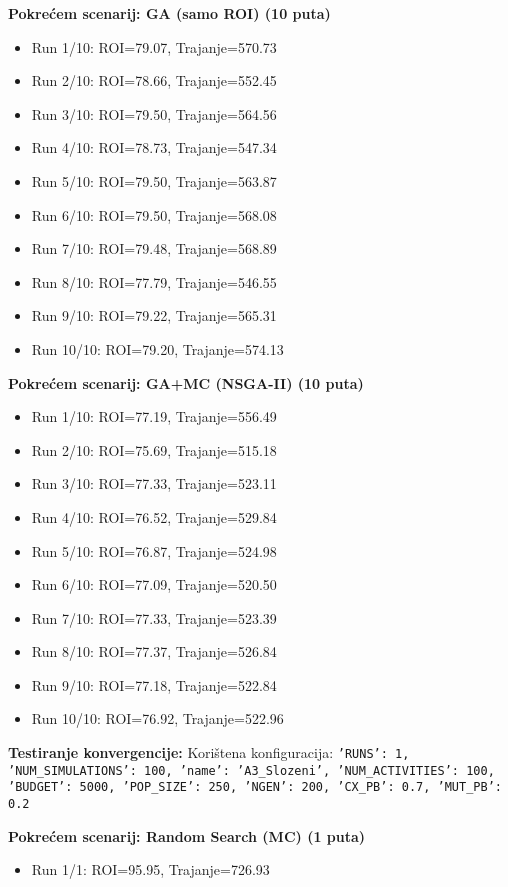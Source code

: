 \textbf{Pokrećem scenarij: GA (samo ROI) (10 puta)}
\begin{itemize}
    \item Run 1/10: ROI=79.07, Trajanje=570.73
    \item Run 2/10: ROI=78.66, Trajanje=552.45
    \item Run 3/10: ROI=79.50, Trajanje=564.56
    \item Run 4/10: ROI=78.73, Trajanje=547.34
    \item Run 5/10: ROI=79.50, Trajanje=563.87
    \item Run 6/10: ROI=79.50, Trajanje=568.08
    \item Run 7/10: ROI=79.48, Trajanje=568.89
    \item Run 8/10: ROI=77.79, Trajanje=546.55
    \item Run 9/10: ROI=79.22, Trajanje=565.31
    \item Run 10/10: ROI=79.20, Trajanje=574.13
\end{itemize}

\textbf{Pokrećem scenarij: GA+MC (NSGA-II) (10 puta)}
\begin{itemize}
    \item Run 1/10: ROI=77.19, Trajanje=556.49
    \item Run 2/10: ROI=75.69, Trajanje=515.18
    \item Run 3/10: ROI=77.33, Trajanje=523.11
    \item Run 4/10: ROI=76.52, Trajanje=529.84
    \item Run 5/10: ROI=76.87, Trajanje=524.98
    \item Run 6/10: ROI=77.09, Trajanje=520.50
    \item Run 7/10: ROI=77.33, Trajanje=523.39
    \item Run 8/10: ROI=77.37, Trajanje=526.84
    \item Run 9/10: ROI=77.18, Trajanje=522.84
    \item Run 10/10: ROI=76.92, Trajanje=522.96
\end{itemize}


\textbf{Testiranje konvergencije:}
Korištena konfiguracija: \texttt{'RUNS': 1, 'NUM\_SIMULATIONS': 100, 'name': 'A3\_Slozeni', 'NUM\_ACTIVITIES': 100, 'BUDGET': 5000, 'POP\_SIZE': 250, 'NGEN': 200, 'CX\_PB': 0.7, 'MUT\_PB': 0.2}

\textbf{Pokrećem scenarij: Random Search (MC) (1 puta)}
\begin{itemize}
    \item Run 1/1: ROI=95.95, Trajanje=726.93
\end{itemize}

